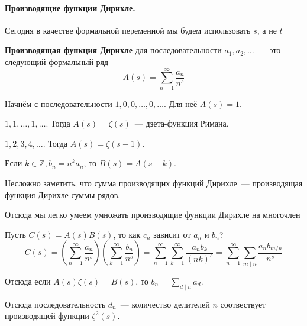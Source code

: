 \documentclass{article}
\begin{document}
    \paragraph{Производящие функции Дирихле.}
    \begin{remark}
        Сегодня в качестве формальной переменной мы будем использовать $s$, а не $t$
    \end{remark}
    \begin{definition}
        \textbf{Производящая функция Дирихле} для последовательности $a_1,a_2,\ldots$~--- это следующий формальный ряд
        $$
        A(s)=\sum\limits_{n=1}^\infty \frac{a_n}{n^s}
        $$
    \end{definition}
    \begin{example}
        Начнём с последовательности $1,0,0,\ldots,0,\ldots$. Для неё $A(s)=1$.
    \end{example}
    \begin{example}
        $1,1,\ldots,1,\ldots$. Тогда $A(s)=\zeta(s)$~--- дзета-функция Римана.
    \end{example}
    \begin{example}
        $1,2,3,4,\ldots$. Тогда $A(s)=\zeta(s-1)$.
    \end{example}
    \begin{claim}
        Если $k\in\mathbb Z,b_n=n^ka_n$, то $B(s)=A(s-k)$.
    \end{claim}
    \begin{claim}
        Несложно заметить, что сумма производящих функций Дирихле~--- производящая функция Дирихле суммы рядов.
    \end{claim}
    \begin{remark}
        Отсюда мы легко умеем умножать производящие функции Дирихле на многочлен
    \end{remark}
    \begin{remark}
        Пусть $C(s)=A(s)B(s)$, то как $c_n$ зависит от $a_n$ и $b_n$?
        $$
        C(s)=\left(\sum\limits_{n=1}^\infty\frac{a_n}{n^s}\right)\left(\sum\limits_{k=1}^\infty\frac{b_n}{n^s}\right)=\sum\limits_{n=1}^\infty\sum\limits_{k=1}^\infty\frac{a_nb_k}{(nk)^s}=\sum\limits_{n=1}^\infty\sum\limits_{m\mathrel{|}n}\frac{a_nb_{m/n}}{n^s}
        $$
    \end{remark}
    \begin{corollary}
        Отсюда если $A(s)\zeta(s)=B(s)$, то $b_n=\sum\limits_{d\mathrel{|}n}a_d$.
    \end{corollary}
    \begin{corollary}
        Отсюда последовательность $d_n$~--- количество делителей $n$ соотвествует производящей функции $\zeta^2(s)$.
    \end{corollary}
\end{document}
